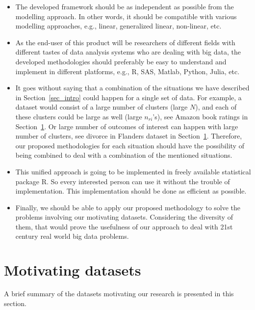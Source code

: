 \documentclass[14pt]{article}
\begin{document}
\begin{itemize}
\item The developed framework should be as independent as possible from the modelling approach. In other words, it should be compatible with various modelling approaches, e.g.,  linear, generalized linear, non-linear, etc.
\item As the end-user of this product will be researchers of different fields with different tastes of data analysis systems who are dealing with big data, the developed methodologies should preferably be easy to understand and implement in different platforms, e.g., \textsf{R}, \textsf{SAS}, \textsf{Matlab}, \textsf{Python}, \textsf{Julia}, etc.
\item It goes without saying that a combination of the situations we have described in Section~\ref{sec_intro} could happen for a single set of data. For example, a dataset would consist of a large number of clusters (large $N$), and each of these clusters could be large as well (large $n_{ri}$'s), see Amazon book ratings in Section~\ref{sec_data_sets}. Or large number of outcomes of interest can happen with large number of clusters, see divorce in Flanders dataset in Section~\ref{sec_data_sets}. Therefore, our proposed methodologies for each situation should have the possibility of being combined to deal with a combination of the mentioned situations.
\item This unified approach is going to be implemented in freely available statistical package \textsf{R}. So every interested person can use it without the trouble of implementation. This implementation should be done as efficient as possible.
\item Finally, we should be able to apply our proposed methodology to solve the problems involving our motivating datasets. Considering the diversity of them, that would prove the usefulness of our approach to deal with 21st century real world big data problems.
\end{itemize}




\section{Motivating datasets}
\label{sec_data_sets}
A brief summary of the datasets motivating our research is presented in this section.
\end{document}
